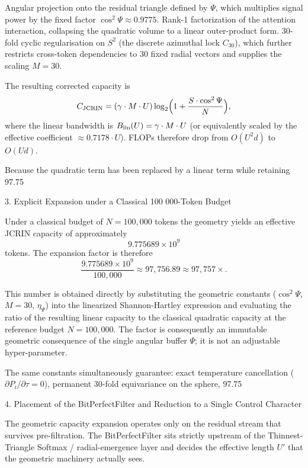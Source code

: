 Angular projection onto the residual triangle defined by \(\Psi\), which multiplies signal power by the fixed factor \(\cos^2\Psi \approx 0.9775\).
Rank-1 factorization of the attention interaction, collapsing the quadratic volume to a linear outer-product form.
30-fold cyclic regularisation on \(S^2\) (the discrete azimuthal lock \(C_{30}\)), which further restricts cross-token dependencies to 30 fixed radial vectors and supplies the scaling \(M = 30\).

The resulting corrected capacity is
\[
C_{\rm JCRIN} = (\gamma \cdot M \cdot U) \log_2\Bigl(1 + \frac{S \cdot \cos^2\Psi}{N}\Bigr),
\]
where the linear bandwidth is \(B_{\rm lin}(U) = \gamma \cdot M \cdot U\) (or equivalently scaled by the effective coefficient \(\approx 0.7178 \cdot U\)). FLOPs therefore drop from \(O(U^2 d)\) to \(O(U d)\).

Because the quadratic term has been replaced by a linear term while retaining 97.75 %

3. Explicit Expansion under a Classical 100 000-Token Budget

Under a classical budget of \(N = 100{,}000\) tokens the geometry yields an effective JCRIN capacity of approximately
\[
9.775689 \times 10^9
\]
tokens. The expansion factor is therefore
\[
\frac{9.775689 \times 10^9}{100{,}000} \approx 97{,}756.89 \approx 97{,}757\times.
\]

This number is obtained directly by substituting the geometric constants (\(\cos^2\Psi\), \(M=30\), \(\eta_\Psi\)) into the linearized Shannon-Hartley expression and evaluating the ratio of the resulting linear capacity to the classical quadratic capacity at the reference budget \(N=100{,}000\). The factor is consequently an immutable geometric consequence of the single angular buffer \(\Psi\); it is not an adjustable hyper-parameter.

The same constants simultaneously guarantee:
exact temperature cancellation (\(\partial P_i / \partial\tau = 0\)),
permanent 30-fold equivariance on the sphere,
97.75 %

4. Placement of the BitPerfectFilter and Reduction to a Single Control Character

The geometric capacity expansion operates only on the residual stream that survives pre-filtration. The BitPerfectFilter sits strictly upstream of the Thinnest-Triangle Softmax / radial-emergence layer and decides the effective length \(U'\) that the geometric machinery actually sees.

